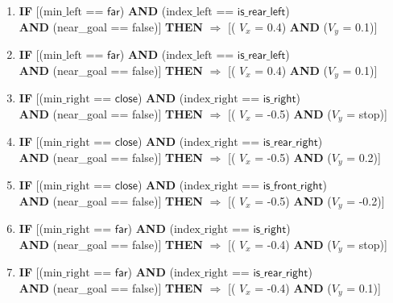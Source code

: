 \begin{enumerate}
	\item \textbf{IF} [($\text{min\_left}$ == $\textsf{far}$) \textbf{AND} ($\text{index\_left}$ == $\textsf{is\_rear\_left}$)\\
	\textbf{AND} (near\_goal == \textsf{false})]
	\textbf{THEN} $\Rightarrow$ [( $V_x$ = \textsf{0.4}) \textbf{AND} ($V_y$ = \textsf{0.1})]
	
	\item \textbf{IF} [($\text{min\_left}$ == $\textsf{far}$) \textbf{AND} ($\text{index\_left}$ == $\textsf{is\_rear\_left}$)\\
	\textbf{AND} (near\_goal == \textsf{false})]
	\textbf{THEN} $\Rightarrow$ [( $V_x$ = \textsf{0.4}) \textbf{AND} ($V_y$ = \textsf{0.1})]
	
	\item \textbf{IF} [($\text{min\_right}$ == $\textsf{close}$) \textbf{AND} ($\text{index\_right}$ == $\textsf{is\_right}$)\\
	\textbf{AND} (near\_goal == \textsf{false})]
	\textbf{THEN} $\Rightarrow$ [( $V_x$ = \textsf{-0.5}) \textbf{AND} ($V_y$ = \textsf{stop})]
	
	\item \textbf{IF} [($\text{min\_right}$ == $\textsf{close}$) \textbf{AND} ($\text{index\_right}$ == $\textsf{is\_rear\_right}$)\\
	\textbf{AND} (near\_goal == \textsf{false})]
	\textbf{THEN} $\Rightarrow$ [( $V_x$ = \textsf{-0.5}) \textbf{AND} ($V_y$ = \textsf{0.2})]
	
	\item \textbf{IF} [($\text{min\_right}$ == $\textsf{close}$) \textbf{AND} ($\text{index\_right}$ == $\textsf{is\_front\_right}$)\\
	\textbf{AND} (near\_goal == \textsf{false})]
	\textbf{THEN} $\Rightarrow$ [( $V_x$ = \textsf{-0.5}) \textbf{AND} ($V_y$ = \textsf{-0.2})]
	
	\item \textbf{IF} [($\text{min\_right}$ == $\textsf{far}$) \textbf{AND} ($\text{index\_right}$ == $\textsf{is\_right}$)\\
	\textbf{AND} (near\_goal == \textsf{false})]
	\textbf{THEN} $\Rightarrow$ [( $V_x$ = \textsf{-0.4}) \textbf{AND} ($V_y$ = \textsf{stop})]
	
	\item \textbf{IF} [($\text{min\_right}$ == $\textsf{far}$) \textbf{AND} ($\text{index\_right}$ == $\textsf{is\_rear\_right}$)\\
	\textbf{AND} (near\_goal == \textsf{false})]
	\textbf{THEN} $\Rightarrow$ [( $V_x$ = \textsf{-0.4}) \textbf{AND} ($V_y$ = \textsf{0.1})]
	

\end{enumerate}
